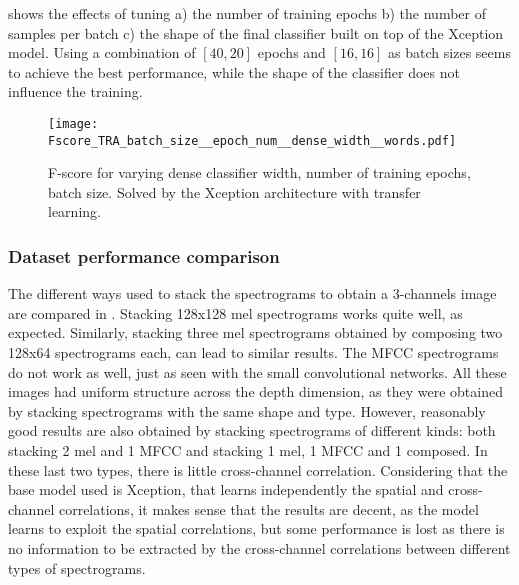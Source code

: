  shows the effects of tuning
a)
the number of training epochs
b)
the number of samples per batch
c)
the shape of the final classifier built on top of the Xception model.
Using a combination of $[40, 20]$ epochs and $[16, 16]$ as batch sizes seems to
achieve the best performance, while the shape of the classifier does not
influence the training.


\begin{figure}[h!]
    \centering
    \texttt{[image: Fscore\_TRA\_batch\_size\_\_epoch\_num\_\_dense\_width\_\_words.pdf]}
    \caption{F-score for varying
        dense classifier width,
        number of training epochs,
        batch size.
        Solved by the Xception architecture with transfer learning.
    }%
    \label{fig:tra_comparison_batch_epoch_dense}
\end{figure}

\subsubsection{Dataset performance comparison}


The different ways used to stack the spectrograms to obtain a 3-channels image
are compared in .
Stacking 128x128 mel spectrograms works quite well, as expected.
Similarly, stacking three mel spectrograms obtained by composing two 128x64
spectrograms each, can lead to similar results.
The MFCC spectrograms do not work as well, just as seen with the small
convolutional networks.
All these images had uniform structure across the depth dimension, as they were
obtained by stacking spectrograms with the same shape and type.
However, reasonably good results are also obtained by stacking spectrograms of
different kinds: both stacking 2 mel and 1 MFCC and stacking 1 mel, 1 MFCC and
1 composed.
In these last two types, there is little cross-channel correlation.
Considering that the base model used is Xception, that learns independently the
spatial and cross-channel correlations, it makes sense that the results are
decent, as the model learns to exploit the spatial correlations, but some
performance is lost as there is no information to be extracted by the
cross-channel correlations between different types of spectrograms.


